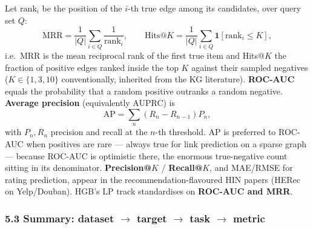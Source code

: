 Let $\mathrm{rank}_i$ be the position of the $i$-th true edge among its candidates, over query set
$Q$:
\[
  \mathrm{MRR}=\frac{1}{|Q|}\sum_{i\in Q}\frac{1}{\mathrm{rank}_i},
  \qquad
  \mathrm{Hits}@K=\frac{1}{|Q|}\sum_{i\in Q}\mathbf{1}\!\left[\mathrm{rank}_i\le K\right],
\]
i.e.\ MRR is the mean reciprocal rank of the first true item and Hits@$K$ the fraction of positive
edges ranked inside the top $K$ against their sampled negatives ($K\in\{1,3,10\}$ conventionally,
inherited from the KG literature). \textbf{ROC-AUC} equals the probability that a random positive
outranks a random negative. \textbf{Average precision} (equivalently AUPRC) is
\[
  \mathrm{AP}=\sum_{n}\left(R_n-R_{n-1}\right)P_n ,
\]
with $P_n,R_n$ precision and recall at the $n$-th threshold. AP is preferred to ROC-AUC when
positives are rare --- always true for link prediction on a sparse graph --- because ROC-AUC is
optimistic there, the enormous true-negative count sitting in its denominator.
\textbf{Precision@$K$} / \textbf{Recall@$K$}, and MAE/RMSE for rating prediction, appear in the
recommendation-flavoured HIN papers (HERec on Yelp/Douban). HGB's LP track standardises on
\textbf{ROC-AUC and MRR}.

\subsubsection*{5.3 Summary: dataset $\to$ target $\to$ task $\to$ metric}

